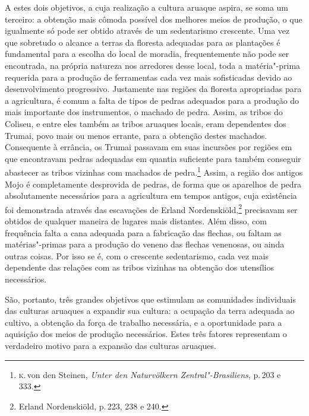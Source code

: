 A estes dois objetivos, a cuja realização a cultura aruaque aspira, se
soma um terceiro: a obtenção mais cômoda possível dos melhores 
meios de produção, o que igualmente só pode
ser obtido através de um sedentarismo crescente. Uma vez que sobretudo
o alcance a terras da floresta adequadas para as plantações é
fundamental para a escolha do local de moradia, frequentemente não pode
ser encontrada, na própria natureza nos arredores desse local, toda a
matéria"-prima requerida para a produção de ferramentas cada vez mais
sofisticadas devido ao desenvolvimento progressivo. Justamente nas
regiões da floresta apropriadas para a agricultura, é comum a falta de tipos 
de pedras adequados para a produção do mais importante dos instrumentos, o machado de pedra. 
Assim, as tribos do Coliseu, e
entre eles também as tribos aruaques locais, eram dependentes dos Trumai, povo mais ou
menos errante, para a
obtenção destes machados. Consequente à errância, os Trumai passavam em suas incursões por regiões em que
encontravam pedras adequadas em quantia suficiente para também conseguir
abastecer as tribos vizinhas com machados de pedra.\footnote{\textsc{k}.\,von den
  Steinen, \textit{Unter den Naturvölkern Zentral"-Brasiliens}, p.\,203 e
  333.} Assim, a região dos antigos Mojo é completamente desprovida de
pedras, de forma que os aparelhos de pedra absolutamente necessários
para a agricultura em tempos antigos, cuja existência foi demonstrada
através das escavações de Erland Nordenskiöld,\footnote{Erland
  Nordenskiöld, p.\,223, 238 e 240.} precisavam ser obtidos de
qualquer maneira de lugares mais distantes. Além disso, com frequência
falta a cana adequada para a fabricação das flechas, ou faltam as
matérias"-primas para a produção do veneno das flechas venenosas, ou
ainda outras coisas. Por isso se é, com o crescente sedentarismo, cada
vez mais dependente das relações com as tribos vizinhas na obtenção dos
utensílios necessários.

São, portanto, três grandes objetivos que estimulam as comunidades
individuais das culturas aruaques a expandir sua cultura: a ocupação da
terra adequada ao cultivo, a obtenção da força de trabalho necessária, e
a oportunidade para a aquisição dos meios de produção necessários. Estes
três fatores representam o verdadeiro motivo para a expansão das
culturas aruaques.


